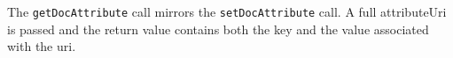 The \verb+getDocAttribute+ call mirrors the \verb+setDocAttribute+ call. A full attributeUri is passed
and the return value contains both the key and the value associated with the uri.
